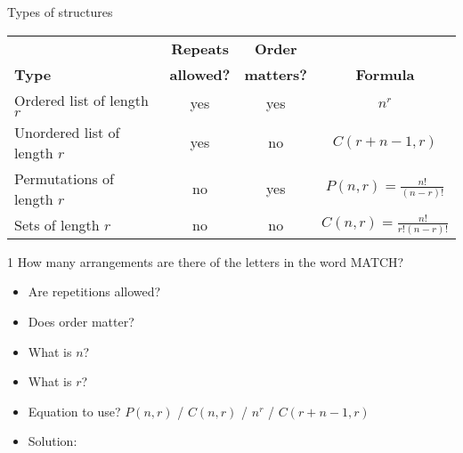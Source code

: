 \documentclass[a4paper,12pt]{book}
\newcounter{question}
\begin{document}
        \newpage

        \begin{intro}{Types of structures}
            \begin{center}
                \begin{tabular}{l | c | c | c }
                    \textbf{}
                        & \textbf{Repeats}
                        & \textbf{Order}
                        & \textbf{}
                    \\
                    \textbf{Type}
                        & \textbf{allowed?}
                        & \textbf{matters?}
                        & \textbf{Formula}
                    \\ \hline
                    Ordered list of length $r$
                        & yes
                        & yes
                        & $n^{r}$

                    \\ \hline
                    Unordered list of length $r$
                        & yes
                        & no
                        & $C(r + n - 1, r)$
                    \\ \hline
                    Permutations of length $r$
                        & no
                        & yes
                        & $P(n,r) = \frac{n!}{(n-r)!}$
                    \\ \hline
                    Sets of length $r$
                        & no
                        & no
                        & $C(n,r) = \frac{n!}{r!(n-r)!}$
                \end{tabular}
            \end{center}
        \end{intro}
        
        \begin{question}{\thequestion}{1}
            How many arrangements are there of the letters in the word MATCH?
            
            \begin{itemize}
                \item[]     Are repetitions allowed?    
                \item[]     Does order matter?          
                \item[]     What is $n$?                
                \item[]     What is $r$?                
                \item[]     Equation to use? $P(n,r)$ / $C(n,r)$ / $n^{r}$ / $C(r+n-1,r)$           
                \item[]     Solution: 
            \end{itemize}
        \end{question}
        
\end{document}
